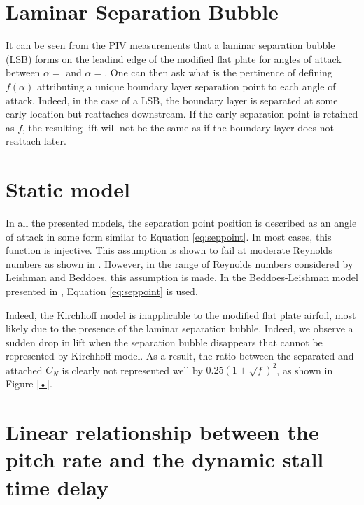 

\section{Laminar Separation Bubble}
\label{LSB}

It can be seen from the PIV measurements that a laminar separation bubble (LSB) forms on the leadind edge of the modified flat plate for angles of attack between $\alpha=$ and $\alpha=$. One can then ask what is the pertinence of defining $f(\alpha)$ attributing a unique boundary layer separation point to each angle of attack. Indeed, in the case of a LSB, the boundary layer is separated at some early location but reattaches downstream. If the early separation point is retained as $f$, the resulting lift will not be the same as if the boundary layer does not reattach later. 

\section{Static model}

In all the presented models, the separation point position is described as an angle of attack in some form similar to Equation \eqref{eq:seppoint}. In most cases, this function is injective. This assumption is shown to fail at moderate Reynolds numbers as shown in \autocite{tank_possibility_2017}. However, in the range of Reynolds numbers considered by Leishman and Beddoes, this assumption is made. In the Beddoes-Leishman model presented in \autocite{leishman_semi-empirical_1989}, Equation \eqref{eq:seppoint} is used.

Indeed, the Kirchhoff model is inapplicable to the modified flat plate airfoil, most likely due to the presence of the laminar separation bubble. Indeed, we observe a sudden drop in lift when the separation bubble disappears that cannot be represented by Kirchhoff model. As a result, the ratio between the separated and attached $C_N$ is clearly not represented well by $0.25(1+\sqrt{f})^2$, as shown in Figure \ref{•}.

\section{Linear relationship between the pitch rate and the dynamic stall time delay}

